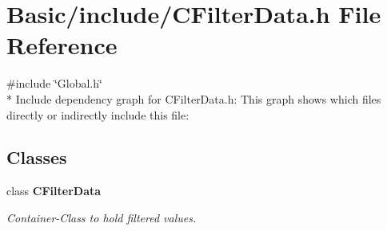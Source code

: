 \section{Basic/include/\-C\-Filter\-Data.h File Reference}
\label{CFilterData_8h}
{\ttfamily \#include \char`\"{}Global.\-h\char`\"{}}\\*
Include dependency graph for C\-Filter\-Data.\-h\-:
This graph shows which files directly or indirectly include this file\-:
\subsection*{Classes}
\begin{DoxyCompactItemize}
\item 
class {\bf C\-Filter\-Data}
\begin{DoxyCompactList}\small\item\em Container-\/\-Class to hold filtered values. \end{DoxyCompactList}\end{DoxyCompactItemize}

